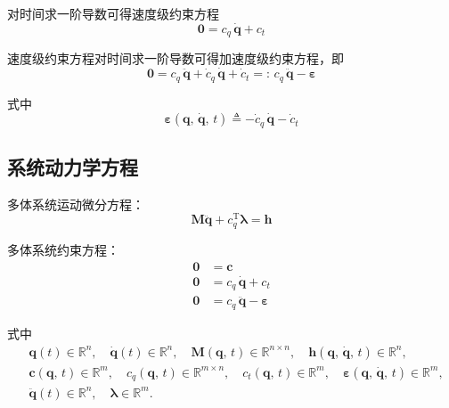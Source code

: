 对时间求一阶导数可得速度级约束方程
\begin{equation}\label{eq:3.vel_constraint}
\boldsymbol{0} = c_q\, \dot{\boldsymbol{q}} + c_t
\end{equation}

速度级约束方程对时间求一阶导数可得加速度级约束方程，即
\begin{equation}\label{eq:3.acc_constraint}
\boldsymbol{0} = c_q\, \ddot{\boldsymbol{q}} + \dot{c}_q\, \dot{\boldsymbol{q}} + \dot{c}_t =:\, c_q\, \ddot{\boldsymbol{q}} - \boldsymbol{\varepsilon}
\end{equation}

式中
\begin{equation}\label{eq:3.epsilon_def}
\boldsymbol{\varepsilon}(\boldsymbol{q},\, \dot{\boldsymbol{q}},\, t) \triangleq -\dot{c}_q\, \dot{\boldsymbol{q}} - \dot{c}_t
\end{equation}


\subsection{系统动力学方程}

多体系统运动微分方程：
\begin{equation*}
\boldsymbol{M} \ddot{\boldsymbol{q}} + c_q^{\mathrm{T}} \boldsymbol{\lambda} = \boldsymbol{h}
\end{equation*}

多体系统约束方程：
\begin{align}
\boldsymbol{0} &= \boldsymbol{c} \\
\boldsymbol{0} &= c_q\, \dot{\boldsymbol{q}} + c_t \\
\boldsymbol{0} &= c_q\, \ddot{\boldsymbol{q}} - \boldsymbol{\varepsilon}
\end{align}

式中
\begin{equation}
\begin{aligned}
&\boldsymbol{q}(t) \in \mathbb{R}^n, \quad \dot{\boldsymbol{q}}(t) \in \mathbb{R}^n, \quad \boldsymbol{M}(\boldsymbol{q},\, t) \in \mathbb{R}^{n \times n}, \quad \boldsymbol{h}(\boldsymbol{q},\, \dot{\boldsymbol{q}},\, t) \in \mathbb{R}^n, \\
&\boldsymbol{c}(\boldsymbol{q},\, t) \in \mathbb{R}^m, \quad c_q(\boldsymbol{q},\, t) \in \mathbb{R}^{m \times n}, \quad c_t(\boldsymbol{q},\, t) \in \mathbb{R}^m, \quad \boldsymbol{\varepsilon}(\boldsymbol{q},\, \dot{\boldsymbol{q}},\, t) \in \mathbb{R}^m, \\
&\ddot{\boldsymbol{q}}(t) \in \mathbb{R}^n, \quad \boldsymbol{\lambda} \in \mathbb{R}^m.
\end{aligned}
\end{equation}


